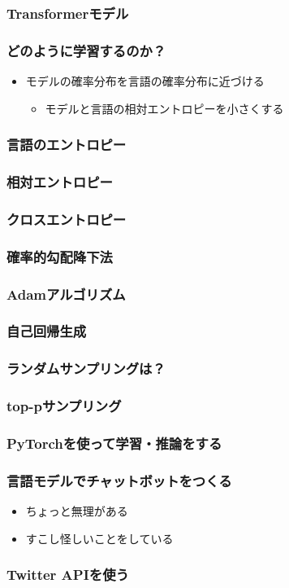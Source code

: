 \documentclass[14pt]{beamer}
\begin{document}
\begin{frame}
	\frametitle{Transformerモデル}

\end{frame}

\begin{frame}
	\frametitle{どのように学習するのか？}

	\begin{itemize}
		\item モデルの確率分布を言語の確率分布に近づける
			\begin{itemize}
				\item モデルと言語の相対エントロピーを小さくする
			\end{itemize}
	\end{itemize}
\end{frame}

\begin{frame}
	\frametitle{言語のエントロピー}
\end{frame}

\begin{frame}
	\frametitle{相対エントロピー}
\end{frame}

\begin{frame}
	\frametitle{クロスエントロピー}
\end{frame}

\begin{frame}
	\frametitle{確率的勾配降下法}
\end{frame}

\begin{frame}
	\frametitle{Adamアルゴリズム}
\end{frame}

\begin{frame}
	\frametitle{自己回帰生成}
\end{frame}

\begin{frame}
	\frametitle{ランダムサンプリングは？}
\end{frame}

\begin{frame}
	\frametitle{top-pサンプリング}
\end{frame}

\begin{frame}
	\frametitle{PyTorchを使って学習・推論をする}
\end{frame}

\begin{frame}
	\frametitle{言語モデルでチャットボットをつくる}

	\begin{itemize}
		\item ちょっと無理がある
		\item すこし怪しいことをしている
	\end{itemize}
\end{frame}

\begin{frame}
	\frametitle{Twitter APIを使う}
\end{frame}
\end{document}
